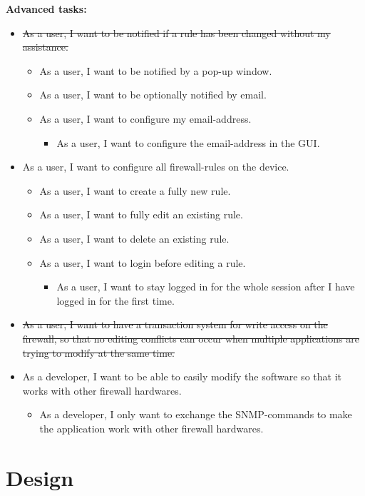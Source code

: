 \documentclass[11pt, a4paper]{article}
\begin{document}
\noindent \textbf{Advanced tasks:}
\begin{itemize}
\item \sout{As a user, I want to be notified if a rule has been changed without my assistance.}
\begin{itemize}
\item As a user, I want to be notified by a pop-up window.
\item As a user, I want to be optionally notified by email.
\item As a user, I want to configure my email-address.
\begin{itemize}
\item As a user, I want to configure the email-address in the GUI.
\end{itemize}
\end{itemize}
\item As a user, I want to configure all firewall-rules on the device.
\begin{itemize}
\item As a user, I want to create a fully new rule.
\item As a user, I want to fully edit an existing rule.
\item As a user, I want to delete an existing rule.
\item As a user, I want to login before editing a rule.
\begin{itemize}
\item As a user, I want to stay logged in for the whole session after I have logged in for the first time.
\end{itemize}
\end{itemize}
\item \sout{As a user, I want to have a transaction system for write access on the firewall, so that no editing conflicts can occur when multiple applications are trying to modify at the same time.}
\item As a developer, I want to be able to easily modify the software so that it works with other firewall hardwares.
\begin{itemize}
\item As a developer, I only want to exchange the SNMP-commands to make the application work with other firewall hardwares.
\end{itemize}
\end{itemize}

\section{Design}
\end{document}
